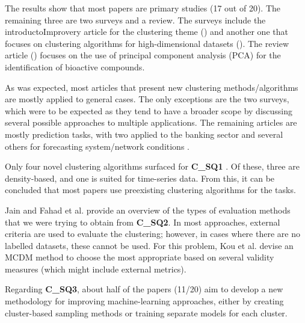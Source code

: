 The results show that most papers are primary studies (17 out of 20). The remaining three are two surveys and a review. The surveys include the introductoImprovery article for the clustering theme (\cite{Jain_Dataclustering50_2010}) and another one that focuses on clustering algorithms for high-dimensional datasets (\cite{Fahad.Alshatri.ea_SurveyClusteringAlgorithms_2014a}). The review article (\cite{Granato.Santos.ea_Useprincipalcomponent_2018}) focuses on the use of principal component analysis (PCA) for the identification of bioactive compounds.

As was expected, most articles that present new clustering methods/algorithms are mostly applied to general cases. The only exceptions are the two surveys, which were to be expected as they tend to have a broader scope by discussing several possible approaches to multiple applications. The remaining articles are mostly prediction tasks, with two applied to the banking sector \cite{Kou20141, Behera.Panigrahi_CreditCardFraud_2015} and several others for forecasting system/network conditions \cite{Fahiman.Erfani.ea_Improvingloadforecasting_2017, Tang.Liu.ea_ImprovedFuzzyNeural_2017, Jahangir.Tayarani.ea_DeepLearningBasedForecasting_2021, Yang.Li.ea_BayesianDeepLearningBased_2020}.

Only four novel clustering algorithms surfaced for \textbf{C\_SQ1} \cite{Paparrizos.Gravano_kShapeEfficientAccurate_2015a, Nie.Wang.ea_Clusteringprojectedclustering_2014a, Rodriguez.Laio_Clusteringfastsearch_2014, Du.Ding.ea_Studydensitypeaks_2016}. Of these, three are density-based, and one is suited for time-series data. From this, it can be concluded that most papers use preexisting clustering algorithms for the tasks.

Jain \cite{Jain_Dataclustering50_2010} and Fahad et al. \cite{Fahad.Alshatri.ea_SurveyClusteringAlgorithms_2014a} provide an overview of the types of evaluation methods that we were trying to obtain from \textbf{C\_SQ2}. In most approaches, external criteria are used to evaluate the clustering; however, in cases where there are no labelled datasets, these cannot be used. For this problem, Kou et al. \cite{Kou20141} devise an MCDM method to choose the most appropriate based on several validity measures (which might include external metrics).

Regarding \textbf{C\_SQ3}, about half of the papers (11/20) aim to develop a new methodology for improving machine-learning approaches, either by creating cluster-based sampling methods or training separate models for each cluster. 

